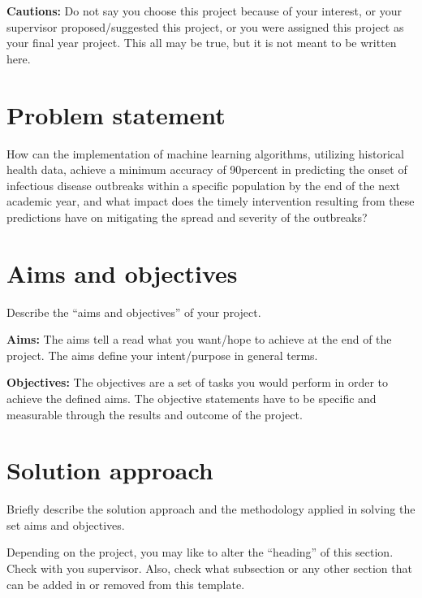 \textbf{Cautions:} Do not say you choose this project because of your interest, or your supervisor proposed/suggested this project, or you were assigned this project as your final year project. This all may be true, but it is not meant to be written here.

\section{Problem statement}
\label{sec:intro_prob_art}
How can the implementation of machine learning algorithms, utilizing historical health data, achieve a minimum accuracy of 90percent in predicting the onset of infectious disease outbreaks within a specific population by the end of the next academic year, and what impact does the timely intervention resulting from these predictions have on mitigating the spread and severity of the outbreaks?

\section{Aims and objectives}
\label{sec:intro_aims_obj}
Describe the ``aims and objectives'' of your project. 

\textbf{Aims:} The aims tell a read what you want/hope to achieve at the end of the project. The  aims define your intent/purpose in general terms.  

\textbf{Objectives:} The objectives are a set of tasks you would perform in order to achieve the defined aims. The objective statements have to be specific and measurable through the results and outcome of the project.



\section{Solution approach}
\label{sec:intro_sol} %
Briefly describe the solution approach and the methodology applied in solving the set aims and objectives.

Depending on the project, you may like to alter the ``heading'' of this section. Check with you supervisor. Also, check what subsection or any other section that can be added in or removed from this template.

